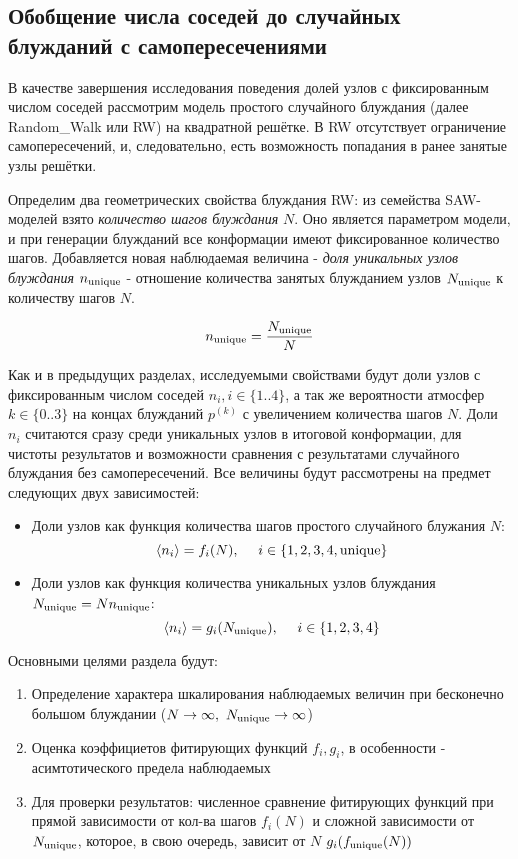 \subsection{Обобщение числа соседей до случайных блужданий с самопересечениями}

В качестве завершения исследования поведения долей узлов с фиксированным числом соседей рассмотрим модель простого случайного блуждания (далее Random\_Walk или RW) на квадратной решётке. 
В RW отсутствует ограничение самопересечений, и, следовательно, есть возможность попадания в ранее занятые узлы решётки.

Определим два геометрических свойства блуждания RW: из семейства SAW-моделей взято \textit{количество шагов блуждания} $N$. 
Оно является параметром модели, и при генерации блужданий все конформации имеют фиксированное количество шагов.
Добавляется новая наблюдаемая величина - \textit{доля уникальных узлов блуждания} $n_{\textup{unique}}$ - отношение количества занятых блужданием узлов $N_{\textup{unique}}$ к количеству шагов $N$.

\begin{equation}
n_{\textup{unique}} = \frac{N_{\textup{unique}}}{N}
\label{eq:nun}
\end{equation}

Как и в предыдущих разделах, исследуемыми свойствами будут доли узлов с фиксированным числом соседей $n_i, i \in \{1..4\}$, а так же вероятности атмосфер $k \in \{0..3\}$ на концах блужданий $p^{(k)}$ с увеличением количества шагов $N$.
Доли $n_i$ считаются сразу среди уникальных узлов в итоговой конформации, для чистоты результатов и возможности сравнения с результатами случайного блуждания без самопересечений.
Все величины будут рассмотрены на предмет следующих двух зависимостей:

\begin{itemize}
\item Доли узлов как функция количества шагов простого случайного блужания $N$: 
\[ \langle n_i \rangle = f_i(N),\ \ \ \ i \in \{1,2,3,4, \textup{unique}\} \]
\item Доли узлов как функция количества уникальных узлов блуждания $N_{\textup{unique}} = N n_{\textup{unique}}$:
\[ \langle n_i \rangle = g_i(N_{\textup{unique}}),\ \ \ \ i \in \{1,2,3,4\} \]
\end{itemize}

Основными целями раздела будут:

\begin{enumerate}
\item Определение характера шкалирования наблюдаемых величин при бесконечно большом блуждании ($N \to \infty,\ \Nun \to \infty$)
\item Оценка коэффициетов фитирующих функций $f_i, g_i$, в особенности - асимтотического предела наблюдаемых
\item Для проверки результатов: численное сравнение фитирующих функций при прямой зависимости от кол-ва шагов $f_i(N)$ и сложной зависимости от $N_{\textup{unique}}$, которое, в свою очередь, зависит от $N$ $g_i(f_{\textup{unique}}(N))$
\end{enumerate}



